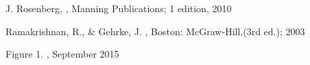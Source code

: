 \documentclass[a4paper, 11pt]{article}
\begin{document}
\begin{thebibliography}{29}
J. Rosenberg, \emph{}, Manning Publications; 1 edition, 2010
\vspace{\baselineskip}

Ramakrishnan, R., \& Gehrke, J. \emph{}, Boston: McGraw-Hill,(3rd ed.); 2003
\vspace{\baselineskip}

Figure 1. \emph{}, September 2015
\vspace{\baselineskip}

\end{thebibliography}
\end{document}
